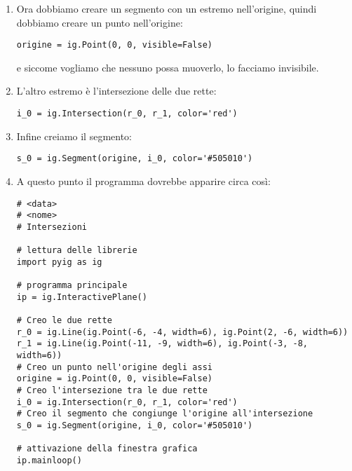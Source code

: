 \begin{enumerate} [noitemsep]
\begin{lstlisting}
r_0 = ig.Line(ig.Point(-6, -4, width=6), ig.Point(2, -6, width=6))
r_1 = ig.Line(ig.Point(-11, -9, width=6), ig.Point(-3, -8, width=6))
\end{lstlisting}

Eseguiamo il programma controllando che rispetti le specifiche.

\item Ora dobbiamo creare un segmento con un estremo nell'origine, quindi 
dobbiamo creare un punto nell'origine:

\begin{lstlisting}
origine = ig.Point(0, 0, visible=False)
\end{lstlisting}

e siccome vogliamo che nessuno possa muoverlo, lo facciamo invisibile.

\item L'altro estremo è l'intersezione delle due rette:

\begin{lstlisting}
i_0 = ig.Intersection(r_0, r_1, color='red')
\end{lstlisting}

\item Infine creiamo il segmento:

\begin{lstlisting}
s_0 = ig.Segment(origine, i_0, color='#505010')
\end{lstlisting}

\item A questo punto il programma dovrebbe apparire circa così:

\begin{lstlisting}
# <data>
# <nome>
# Intersezioni

# lettura delle librerie
import pyig as ig

# programma principale
ip = ig.InteractivePlane()

# Creo le due rette
r_0 = ig.Line(ig.Point(-6, -4, width=6), ig.Point(2, -6, width=6))
r_1 = ig.Line(ig.Point(-11, -9, width=6), ig.Point(-3, -8, width=6))
# Creo un punto nell'origine degli assi
origine = ig.Point(0, 0, visible=False)
# Creo l'intersezione tra le due rette
i_0 = ig.Intersection(r_0, r_1, color='red')
# Creo il segmento che congiunge l'origine all'intersezione
s_0 = ig.Segment(origine, i_0, color='#505010')

# attivazione della finestra grafica
ip.mainloop()
\end{lstlisting}


\end{enumerate}
